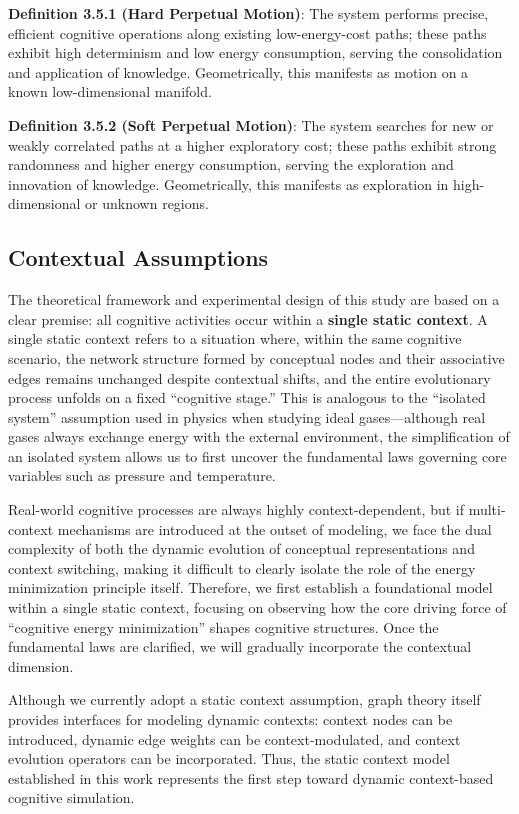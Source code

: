 \documentclass[10pt,onecolumn]{article}
\begin{document}
\textbf{Definition 3.5.1 (Hard Perpetual Motion)}: The system performs precise, efficient cognitive operations along existing low-energy-cost paths; these paths exhibit high determinism and low energy consumption, serving the consolidation and application of knowledge. Geometrically, this manifests as motion on a known low-dimensional manifold.

\textbf{Definition 3.5.2 (Soft Perpetual Motion)}: The system searches for new or weakly correlated paths at a higher exploratory cost; these paths exhibit strong randomness and higher energy consumption, serving the exploration and innovation of knowledge. Geometrically, this manifests as exploration in high-dimensional or unknown regions.

\subsection{Contextual Assumptions}

The theoretical framework and experimental design of this study are based on a clear premise: all cognitive activities occur within a \textbf{single static context}. A single static context refers to a situation where, within the same cognitive scenario, the network structure formed by conceptual nodes and their associative edges remains unchanged despite contextual shifts, and the entire evolutionary process unfolds on a fixed “cognitive stage.” This is analogous to the “isolated system” assumption used in physics when studying ideal gases—although real gases always exchange energy with the external environment, the simplification of an isolated system allows us to first uncover the fundamental laws governing core variables such as pressure and temperature.

Real-world cognitive processes are always highly context-dependent, but if multi-context mechanisms are introduced at the outset of modeling, we face the dual complexity of both the dynamic evolution of conceptual representations and context switching, making it difficult to clearly isolate the role of the energy minimization principle itself. Therefore, we first establish a foundational model within a single static context, focusing on observing how the core driving force of “cognitive energy minimization” shapes cognitive structures. Once the fundamental laws are clarified, we will gradually incorporate the contextual dimension.

Although we currently adopt a static context assumption, graph theory itself provides interfaces for modeling dynamic contexts: context nodes can be introduced, dynamic edge weights can be context-modulated, and context evolution operators can be incorporated. Thus, the static context model established in this work represents the first step toward dynamic context-based cognitive simulation.
\end{document}
